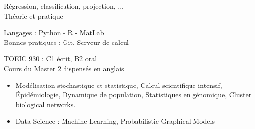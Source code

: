 

Régression, classification, projection, ... \\
Théorie et pratique\\
\vspace{0.2cm}

Langages :  Python - R - MatLab \\
Bonnes pratiques : Git, Serveur de calcul

\vspace{0.2cm}

\vspace{0.1cm}
TOEIC 930 : C1 écrit, B2 oral\\
Cours du Master 2 dispensés en anglais
\vspace{0.25cm}





\begin{itemize}
\item 
    Modélisation stochastique et statistique, 
    Calcul scientifique intensif,
    \'Epidémiologie, 
    Dynamique de population,
    Statistiques en génomique, Cluster biological networks.
\item Data Science : Machine Learning, Probabilistic Graphical Models
\end{itemize}

